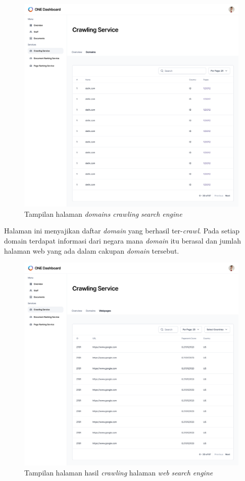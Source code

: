 \begin{enumerate}[label=\alph*)., leftmargin=1\parindent]
	\begin{figure}[H]
		\centering
		\includegraphics[keepaspectratio, width=13cm]{gambar/uiux_crawling_domains.png}
		\caption{Tampilan halaman \textit{domains crawling} \textit{search engine}}
		\label{gambar:uiux_crawling_domains.png}
	\end{figure}

	Halaman ini menyajikan daftar \textit{domain} yang berhasil ter-\textit{crawl}. Pada setiap domain terdapat informasi dari negara mana \textit{domain} itu berasal dan jumlah halaman web yang ada dalam cakupan \textit{domain} tersebut.


	\begin{figure}[H]
		\centering
		\includegraphics[keepaspectratio, width=13cm]{gambar/uiux_crawling_webpages.png}
		\caption{Tampilan halaman hasil \textit{crawling} halaman \textit{web} \textit{search engine}}
		\label{gambar:uiux_crawling_webpages.png}
	\end{figure}



\end{enumerate}
